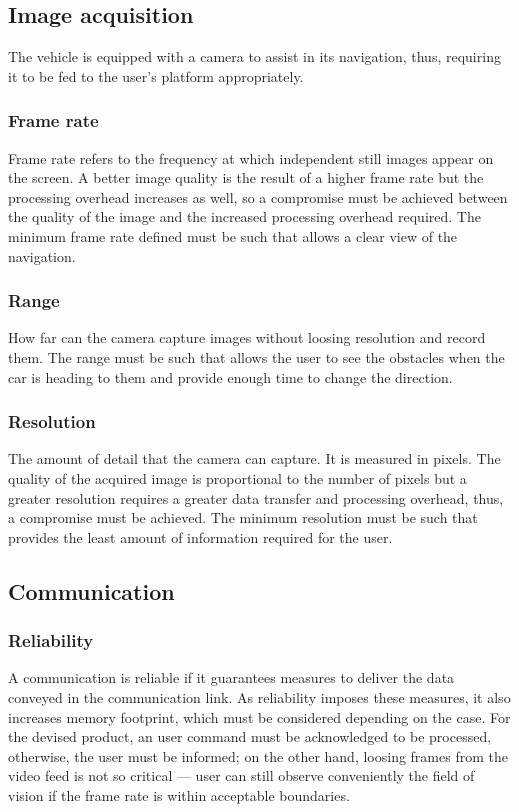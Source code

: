 \subsection{Image acquisition}%
\label{sec:image-acquisit}
The vehicle is equipped with a camera to assist in its navigation,
thus, requiring it to be fed to the user's platform appropriately.
\subsubsection{Frame rate}%
\label{sec:org5adf4ee}
Frame rate refers to the frequency at which independent still images appear on the screen. A better image quality is the result of a higher frame rate but the processing overhead increases as well, so a compromise must be achieved between the quality of the image and the increased processing overhead required. The minimum frame rate defined must be such that allows a clear view of the navigation.
\subsubsection{Range}%
\label{sec:orgecb044c}
How far can the camera capture images without loosing resolution and record them. The range must be such that allows the user to see the obstacles when the car is heading to them and provide enough time to change the direction.
\subsubsection{Resolution}%
\label{sec:orgba87554}%
The amount of detail that the camera can capture. It is measured in pixels. The quality of the acquired image is proportional to the number of pixels but a greater resolution requires a greater data transfer and processing overhead, thus, a compromise must be achieved. The minimum resolution must be such that provides the least amount of information required for the user. 
\subsection{Communication}%
\label{sec:org4241610}
\subsubsection{Reliability}%
\label{sec:orgdcb920d}
A communication is reliable if it guarantees measures to deliver the data
conveyed in the communication link. As reliability imposes these measures, it
also increases memory footprint, which must be considered
depending on the case. For the devised product, an user command
must be acknowledged to be processed, otherwise, the user must be informed; on
the other hand, loosing frames from the video feed is not so critical — user can
still observe conveniently the ﬁeld of vision if the frame rate is within
acceptable boundaries.
